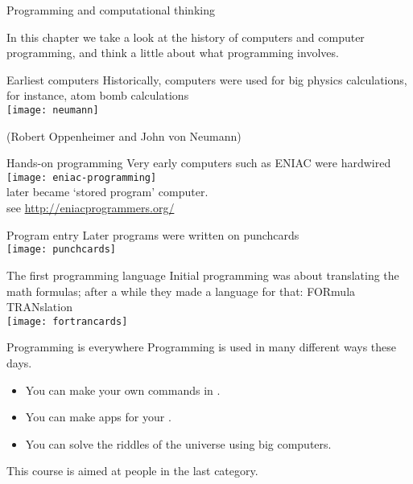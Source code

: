 
 {Programming and computational thinking}

In this chapter we take a look at the history of computers and computer programming,
and think a little about what programming involves.

\begin{slide}{Earliest computers}
  \label{sl:neumann}
  Historically, computers were used for big physics calculations, for
  instance, atom bomb calculations\\

  \texttt{[image: neumann]}

  (Robert Oppenheimer and John von Neumann)
\end{slide}

\begin{slide}{Hands-on programming}
  \label{sl:eniac}
  Very early computers such as ENIAC were hardwired\\
  \texttt{[image: eniac-programming]}\\
  later became `stored program' computer.\\
  see \url{http://eniacprogrammers.org/}
\end{slide}

\begin{slide}{Program entry}
  \label{sl:punch}
  Later programs were written on punchcards\\
  \texttt{[image: punchcards]}
\end{slide}

\begin{slide}{The first programming language}
  \label{sl:fcard}
  Initial programming was about translating the math formulas; after a
  while they made a language for that: FORmula TRANslation\\
  \texttt{[image: fortrancards]}
\end{slide}

\begin{slide}{Programming is everywhere}
  \label{sl:progeverywhere}
  Programming is used in many different ways these days.
  \begin{itemize}
  \item You can make your own commands in
    .
  \item You can make apps for your .
  \item You can solve the riddles of the universe using big computers.
  \end{itemize}
  This course is aimed at people in the last category.
\end{slide}

